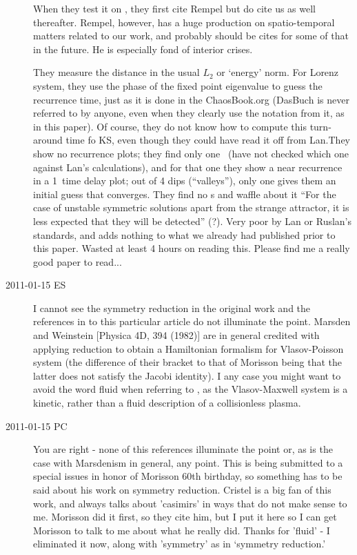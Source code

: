 \begin{description}
When they test it on \KSe, they first cite Rempel
\etal{} but do cite us as well thereafter. Rempel,
however, has a huge production on spatio-temporal matters related to our
work, and probably should be
cites for some of that in the future. He is especially fond of interior
crises.

They measure the distance in the usual $L_2$ or `energy' norm. For Lorenz
system, they use the phase of the fixed point eigenvalue to guess the
recurrence time, just as it is done in the ChaosBook.org (DasBuch is
never referred to by anyone, even when they clearly use the notation from
it, as in this paper). Of course, they do not know how to compute this
turn-around time fo KS, even though they could have read it off from
Lan.They show no recurrence plots; they find only one \po\
(have not checked which one against Lan's
calculations), and for that one they show a near
recurrence in a 1\dmn\ time delay plot; out of 4 dips (``valleys''), only
one gives them an initial guess that converges. They find no \rpo s and
waffle about it ``For the case of unstable symmetric solutions apart from
the strange attractor, it is less expected that they will be detected''
(?). Very poor by Lan or Ruslan's standards, and adds nothing to what we
already had published prior to this paper. Wasted at least 4 hours on
reading this. Please find me a really good paper to read...

\item[2011-01-15 ES]
I cannot see the symmetry reduction in the original work
and the references in \rf{Morr98} to this particular article do not
illuminate the point. Marsden and Weinstein [Physica 4D, 394 (1982)]
are in general credited with applying reduction
to obtain a Hamiltonian formalism for Vlasov-Poisson system (the difference
of their bracket to that of Morisson being that the latter does not satisfy
the Jacobi identity). I any case you might want to avoid the word fluid when
referring to \rf{Morr80}, as the Vlasov-Maxwell system is a kinetic, rather
than a fluid description of a collisionless plasma.


\item[2011-01-15 PC]
You are right - none of this references illuminate the point or, as is
the case with Marsdenism in general, any point. This is being submitted to
a special issues in honor of Morisson 60th birthday, so something has to be said about
his work on symmetry reduction. Cristel is a big fan of this work, and
always talks about 'casimirs' in ways that do not make sense to me.
Morisson did it first, so they cite him, but I put it here so I can get Morisson
to talk to me about what he really did. Thanks for 'fluid' - I eliminated it now, along
with 'symmetry' as in `symmetry reduction.'


\end{description}
